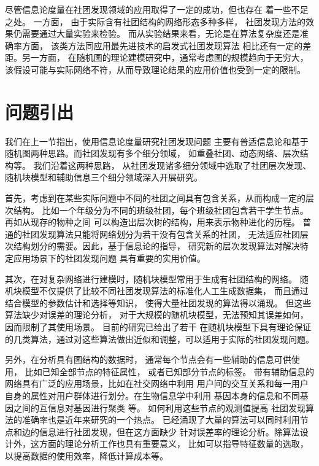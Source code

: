 尽管信息论度量在社团发现领域的应用取得了一定的成功，但也存在
着一些不足之处。
一方面，
由于实际含有社团结构的网络形态多种多样，
社团发现方法的效果仍需要通过大量实验来检验。
而从实验结果来看，无论是在算法复杂度还是准确率方面，
该类方法同应用最先进技术的启发式社团发现算法
相比还有一定的差距。另一方面，
在随机图的理论建模研究中，通常考虑图的规模趋向于无穷大，
该假设可能与实际网络不符，从而导致理论结果的应用价值也受到一定的限制。

\section{问题引出}
我们在上一节指出，使用信息论度量研究社团发现问题
主要有普适信息论和基于随机图两种思路。而社团发现有多个细分领域，
如重叠社团、动态网络、层次结构等。
我们沿着这两种思路，
从社团发现诸多细分领域中选取了社团层次发现、随机块模型和辅助信息三个细分领域深入开展研究。




首先，考虑到在某些实际问题中不同的社团之间具有包含关系，从而构成一定的层次结构。
比如一个年级分为不同的班级社团，每个班级社团包含若干学生节点。
再如从现存的物种之间
可以构造出层次树的结构，用来表示物种进化的历程。
普通的社团发现算法只能将网络划分为若干没有包含关系的社团，
无法适应社团层次结构划分的需要。因此，基于信息论的指导，
研究新的层次发现算法对解决特定应用场景下的社团发现问题
具有重要的实用价值。

其次，在对复杂网络进行建模时，随机块模型常用于生成有社团结构的网络。
随机块模型不仅提供了比较不同社团发现算法的标准化人工生成数据集，
而且通过结合模型的参数估计和选择等知识，
使得大量社团发现的算法得以涌现。
但这些算法缺少对误差的理论分析，
对于大规模的随机块模型，无法预知其误差如何，
因而限制了其使用场景。
目前的研究已给出了若干
在随机块模型下具有理论保证的几类算法，通过对这些算法做出近似和调整，可以适用于实际的社团发现问题。

另外，在分析具有图结构的数据时，
通常每个节点会有一些辅助的信息可供使用，
比如已知全部节点的特征属性，
或者已知部分节点的标签。
带有辅助信息的网络具有广泛的应用场景，比如在社交网络中利用
用户间的交互关系和每一用户自身的属性对用户群体进行划分。在生物信息学中利用
基因本身的信息和不同基因之间的互信息对基因进行聚类 \cite{4359897}等。
如何利用这些节点的观测值提高
社团发现算法的准确率也是近年来研究的一个热点。
已经涌现了大量的算法可以同时利用节点和边的信息进行社团发现，但在这方面缺少
针对误差率的理论分析。除算法设计外，这方面的理论分析工作也具有重要意义，
比如可以指导特征数量的选取，
以提高数据的使用效率，降低计算成本等。



